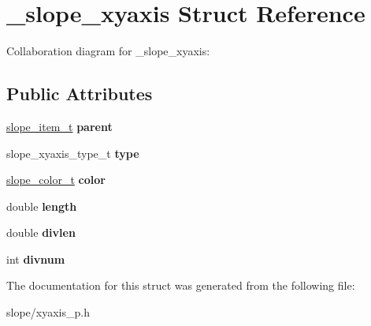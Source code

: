 \hypertarget{struct__slope__xyaxis}{\section{\+\_\+slope\+\_\+xyaxis Struct Reference}
\label{struct__slope__xyaxis}
}


Collaboration diagram for \+\_\+slope\+\_\+xyaxis\+:
\subsection*{Public Attributes}
\begin{DoxyCompactItemize}
\item 
\hypertarget{struct__slope__xyaxis_ab53d8e2917569ff2ba7d4df2fdf89d05}{\hyperlink{group__Item_ga2616141f0e164a876049da51ea3a8646}{slope\+\_\+item\+\_\+t} {\bfseries parent}}\label{struct__slope__xyaxis_ab53d8e2917569ff2ba7d4df2fdf89d05}

\item 
\hypertarget{struct__slope__xyaxis_a56aa7533e274304b0391a18a5c1e760c}{slope\+\_\+xyaxis\+\_\+type\+\_\+t {\bfseries type}}\label{struct__slope__xyaxis_a56aa7533e274304b0391a18a5c1e760c}

\item 
\hypertarget{struct__slope__xyaxis_afbee67325cf0615e6897aa608660024f}{\hyperlink{struct__slope__color}{slope\+\_\+color\+\_\+t} {\bfseries color}}\label{struct__slope__xyaxis_afbee67325cf0615e6897aa608660024f}

\item 
\hypertarget{struct__slope__xyaxis_a6a1eecc666de23bfd52da363a8452ac5}{double {\bfseries length}}\label{struct__slope__xyaxis_a6a1eecc666de23bfd52da363a8452ac5}

\item 
\hypertarget{struct__slope__xyaxis_a815c7ca4b34489e3f85cfb3b0272bd55}{double {\bfseries divlen}}\label{struct__slope__xyaxis_a815c7ca4b34489e3f85cfb3b0272bd55}

\item 
\hypertarget{struct__slope__xyaxis_addc6da873f46da73c1233d2343ed92b9}{int {\bfseries divnum}}\label{struct__slope__xyaxis_addc6da873f46da73c1233d2343ed92b9}

\end{DoxyCompactItemize}


The documentation for this struct was generated from the following file\+:\begin{DoxyCompactItemize}
\item 
slope/xyaxis\+\_\+p.\+h\end{DoxyCompactItemize}
